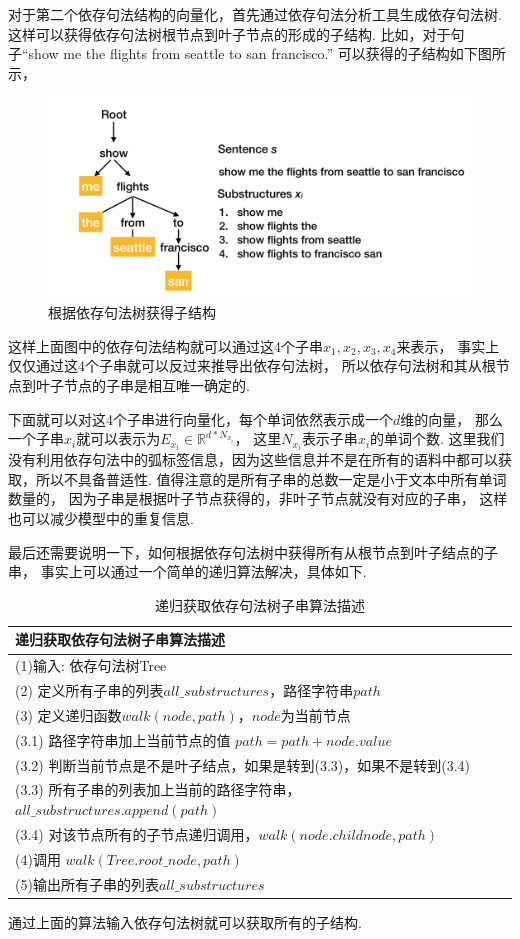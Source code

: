\documentclass[bachelor,adobefonts]{jnuthesis}
\begin{document}
对于第二个依存句法结构的向量化，首先通过依存句法分析工具生成依存句法树.
这样可以获得依存句法树根节点到叶子节点的形成的子结构.
比如，对于句子“show me the flights from seattle to san francisco.”
可以获得的子结构如下图所示，

\begin{figure}[h!]
  \centering
  \includegraphics[width=0.8\linewidth]{依存句法树举例.png}
  \caption{根据依存句法树获得子结构}
\end{figure}

这样上面图中的依存句法结构就可以通过这4个子串$x_{1},x_{2},x_{3},x_{4}$来表示，
事实上仅仅通过这4个子串就可以反过来推导出依存句法树，
所以依存句法树和其从根节点到叶子节点的子串是相互唯一确定的.

下面就可以对这4个子串进行向量化，每个单词依然表示成一个$d$维的向量，
那么一个子串$x_{i}$就可以表示为$E_{x_{i}} \in \mathbb{R}^{d*N_{x_{i}}}$，
这里$N_{x_{i}}$表示子串$x_{i}$的单词个数.
这里我们没有利用依存句法中的弧标签信息，因为这些信息并不是在所有的语料中都可以获取，所以不具备普适性.
值得注意的是所有子串的总数一定是小于文本中所有单词数量的，
因为子串是根据叶子节点获得的，非叶子节点就没有对应的子串，
这样也可以减少模型中的重复信息.

最后还需要说明一下，如何根据依存句法树中获得所有从根节点到叶子结点的子串，
事实上可以通过一个简单的递归算法解决，具体如下.

\begin{table}[h!]
  \centering
  \begin{tabular}{l}
    \toprule
    \textbf{递归获取依存句法树子串算法描述} \\
    \midrule
    (1)输入: 依存句法树Tree \\
    (2) 定义所有子串的列表$all\_substructures$，路径字符串$path$ \\
    (3) 定义递归函数$walk(node,path)$，$node$为当前节点 \\
    (3.1) 路径字符串加上当前节点的值 $path = path + node.value$ \\
    (3.2) 判断当前节点是不是叶子结点，如果是转到(3.3)，如果不是转到(3.4)\\
    (3.3) 所有子串的列表加上当前的路径字符串，$all\_substructures.append(path)$ \\
    (3.4) 对该节点所有的子节点递归调用，$walk(node.childnode,path)$ \\
    (4)调用 $walk(Tree.root\_node,path)$ \\
    (5)输出所有子串的列表$all\_substructures$ \\
    \bottomrule
  \end{tabular}
  \caption{递归获取依存句法树子串算法描述}
\end{table}
通过上面的算法输入依存句法树就可以获取所有的子结构.
\end{document}
